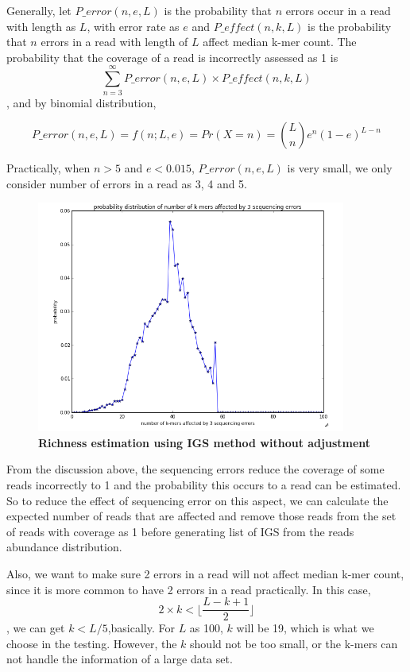 Generally, let $P\_error(n,e,L)$ is the probability that $n$ errors occur in a 
read with length as $L$, with error rate as $e$ and $P\_effect(n,k,L)$ is the 
probability that $n$ 
errors in a read with length of $L$ affect median k-mer count. The probability 
that the coverage of a read is incorrectly assessed as 1 is 
\[\sum_{n=3}^{\infty} P\_error(n,e,L) \times P\_effect(n,k,L)  \],
and by binomial distribution,

\[P\_error(n,e,L) = f(n;L,e) = Pr(X=n) = {L \choose n}e^n(1-e)^{L-n} \] 

Practically, when $n>5$ and $e<0.015$, $P\_error(n,e,L)$ is very small, we only consider
number of errors in a read as 3, 4 and 5.

\begin{figure}[!ht]
 \centerline{\includegraphics[width=4in]{./figures/IGS_affected_k_kmers.png}}
\caption{\bf Richness estimation using IGS method without adjustment }
\label{fig:IGS_affected_k_kmers}
\end{figure}

From the discussion above, the sequencing errors reduce the coverage of some
reads incorrectly to 1 and the probability this occurs to a read can be
estimated. So to reduce the effect of sequencing error on this aspect, we can
calculate the expected number of reads that are affected and remove those reads
from the set of reads with coverage as 1 before generating list of IGS from the
reads abundance distribution.

Also, we want to make sure 2 errors in a read will not affect median k-mer 
count, since it is more common to have 2 errors in a read practically. 
In this case, 
\[2 \times k < \lfloor \frac{L-k+1}{2}\rfloor \],
we can get $k<L/5$,basically. For $L$ as 100, $k$ will be 19, which is what we 
choose in the testing. However, the $k$ should not be too small, or the k-mers 
can not handle the information of a large data set.

